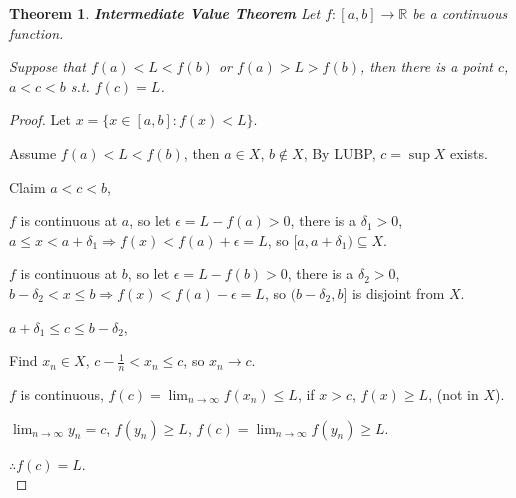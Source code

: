 \documentclass[12pt]{article}
\theoremstyle{plain}
\newtheorem{theorem}{Theorem}[subsection]
\begin{document}
	\newpage
    \begin{theorem}{\textbf{Intermediate Value Theorem}}
        Let $f: [a,b] \to \mathbb{R}$ be a continuous function.

        Suppose that $f(a)<L<f(b)$ or $f(a)>L>f(b)$, then there is a point $c$, 
        $a<c<b$ s.t. $f(c) = L$.
    \end{theorem}
    \begin{proof}
        Let $x =\{x \in [a,b]: f(x)<L\}$.

        Assume $f(a)< L<f(b)$, then $a\in X$, $b\not\in X$,
        By LUBP, $c =\sup X$ exists.

        Claim $a<c<b$, 
        
        $f$ is continuous at $a$, 
        so let $\epsilon =L-f(a)>0$, 
        there is a $\delta_1>0$, $a\leq x<a+\delta_1 
        \Rightarrow f(x)<f(a)+\epsilon =L$,
        so $[a, a+\delta_1) \subseteq X$. 

        $f$ is continuous at $b$, 
        so let $\epsilon =L-f(b)>0$, 
        there is a $\delta_2>0$, $b-\delta_2< x\leq b
        \Rightarrow f(x)<f(a)-\epsilon =L$,
        so $(b-\delta_2, b]$ is disjoint from $X$.
        
        $a+ \delta _1\leq c\leq b-\delta_2$, 

        Find $x_n\in X$, $c-\frac1n<x_n\leq c$, so $x_n\to c$.
        
        $f$ is continuous, $f(c)=\lim_{n\to\infty} f(x_n)\leq L$,
        if $x>c$, $f(x)\geq L$, (not in $X$). 

        $\lim_{n\to\infty} y_n =c$, $f(y_n)\geq L$,
         $f(c) = \lim_{n\to\infty} f(y_n)\geq L$.

         $\therefore f(c)=L$.\\
    \end{proof}
\end{document}
